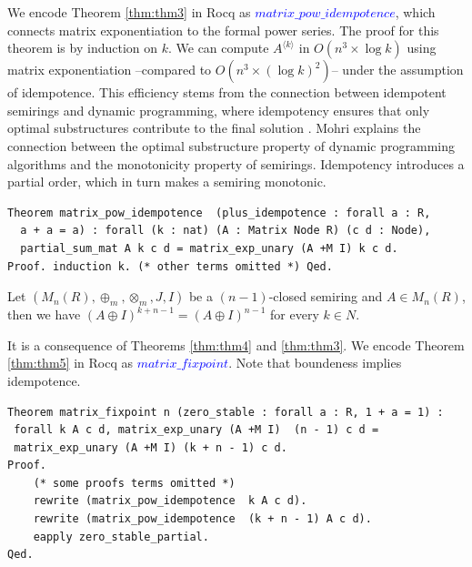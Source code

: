 \documentclass[a4paper,UKenglish,cleveref, autoref, thm-restate, anonymous]{lipics-v2021}
\begin{document}
We encode Theorem \ref{thm:thm3} in Rocq as \textcolor{blue}{$matrix\_pow\_idempotence$}, which connects matrix exponentiation to the formal power series. The proof for this theorem is by induction on \(k\). We can compute \(A^{\langle k \rangle}\) in \(O(n^3 \times \log{k})\) using matrix exponentiation --compared to \(O(n^3 \times (\log{k})^2)\)-- under the assumption of idempotence. 
This efficiency stems from the connection between idempotent semirings and dynamic programming, where idempotency ensures that only optimal substructures contribute to the final solution \cite{10.5555/639508.639512}.
Mohri \cite{10.5555/639508.639512} explains the connection between the optimal substructure property of dynamic programming algorithms and the monotonicity property of semirings. Idempotency introduces a partial order, which in turn makes a semiring monotonic.



\begin{lstlisting}[language=Coq]
Theorem matrix_pow_idempotence  (plus_idempotence : forall a : R, 
  a + a = a) : forall (k : nat) (A : Matrix Node R) (c d : Node),
  partial_sum_mat A k c d = matrix_exp_unary (A +M I) k c d.
Proof. induction k. (* other terms omitted *) Qed.
\end{lstlisting}

\begin{theorem}\label{thm:thm5}
    Let \((M_{n}(R),  \oplus_{m}, \otimes_{m}, J, I)\) be a \((n-1)\)-closed
    semiring and $A \in M_{n}(R)$, 
    then we have  $(A \oplus I)^{k + n - 1} = (A \oplus I)^{n - 1} $ {for every} $k \in N$. 
\end{theorem}    

It is a consequence of Theorems \ref{thm:thm4} and \ref{thm:thm3}.
We encode Theorem \ref{thm:thm5} in Rocq as \textcolor{blue}{$matrix\_fixpoint$}. Note 
that boundeness implies idempotence. 

\begin{lstlisting}[language=Coq]
Theorem matrix_fixpoint n (zero_stable : forall a : R, 1 + a = 1) : 
 forall k A c d, matrix_exp_unary (A +M I)  (n - 1) c d =  
 matrix_exp_unary (A +M I) (k + n - 1) c d.
Proof. 
    (* some proofs terms omitted *)
    rewrite (matrix_pow_idempotence  k A c d).
    rewrite (matrix_pow_idempotence  (k + n - 1) A c d).
    eapply zero_stable_partial.
Qed.
\end{lstlisting}
\end{document}
